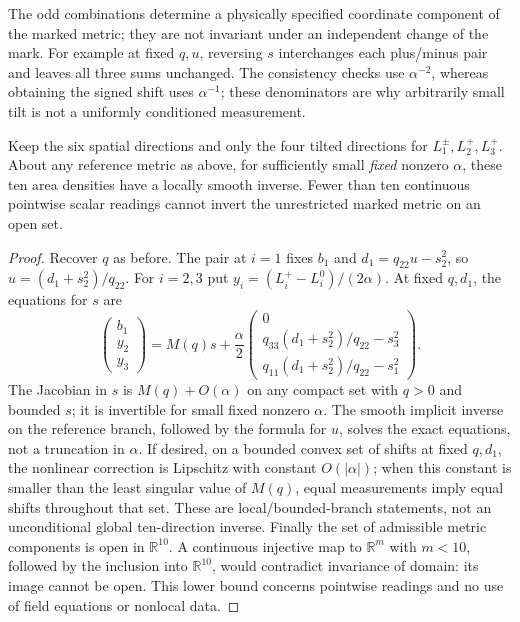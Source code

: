 \documentclass[11pt]{article}
\begin{document}
The odd combinations determine a physically specified coordinate component of the marked metric; they are not invariant under an independent change of the mark. For example at fixed \(q,u\), reversing \(s\) interchanges each plus/minus pair and leaves all three sums unchanged. The consistency checks use \(\alpha^{-2}\), whereas obtaining the signed shift uses \(\alpha^{-1}\); these denominators are why arbitrarily small tilt is not a uniformly conditioned measurement.

\begin{proposition}\label{T10}
Keep the six spatial directions and only the four tilted directions for \(L_1^\pm,L_2^+,L_3^+\). About any reference metric as above, for sufficiently small \emph{fixed} nonzero \(\alpha\), these ten area densities have a locally smooth inverse. Fewer than ten continuous pointwise scalar readings cannot invert the unrestricted marked metric on an open set.
\end{proposition}
\begin{proof}
Recover \(q\) as before. The pair at \(i=1\) fixes \(b_1\) and \(d_1=q_{22}u-s_2^2\), so \(u=(d_1+s_2^2)/q_{22}\). For \(i=2,3\) put \(y_i=(L_i^+-L_i^0)/(2\alpha)\). At fixed \(q,d_1\), the equations for \(s\) are
\[
 \begin{pmatrix}b_1\\y_2\\y_3\end{pmatrix}
 =M(q)s+\frac{\alpha}{2}
   \begin{pmatrix}
     0\\
     q_{33}(d_1+s_2^2)/q_{22}-s_3^2\\
     q_{11}(d_1+s_2^2)/q_{22}-s_1^2
   \end{pmatrix}.
\]
The Jacobian in \(s\) is \(M(q)+O(\alpha)\) on any compact set with \(q>0\) and bounded \(s\); it is invertible for small fixed nonzero \(\alpha\). The smooth implicit inverse on the reference branch, followed by the formula for \(u\), solves the exact equations, not a truncation in \(\alpha\). If desired, on a bounded convex set of shifts at fixed \(q,d_1\), the nonlinear correction is Lipschitz with constant \(O(|\alpha|)\); when this constant is smaller than the least singular value of \(M(q)\), equal measurements imply equal shifts throughout that set. These are local/bounded-branch statements, not an unconditional global ten-direction inverse. Finally the set of admissible metric components is open in \(\mathbb R^{10}\). A continuous injective map to \(\mathbb R^m\) with \(m<10\), followed by the inclusion into \(\mathbb R^{10}\), would contradict invariance of domain: its image cannot be open. This lower bound concerns pointwise readings and no use of field equations or nonlocal data.
\end{proof}
\end{document}
